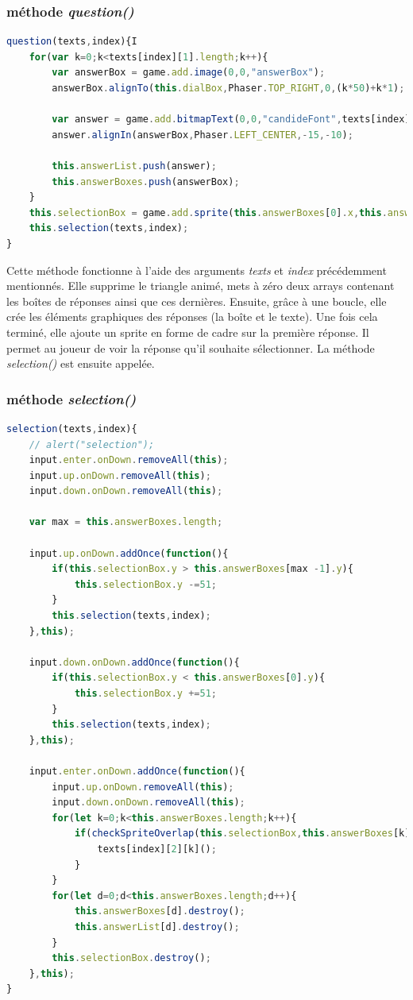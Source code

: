 \documentclass[11pt]{article}
\begin{document}
\subsubsection{méthode \textit{question()}}
\begin{lstlisting}[language=JavaScript]   
question(texts,index){I
    for(var k=0;k<texts[index][1].length;k++){
        var answerBox = game.add.image(0,0,"answerBox");
        answerBox.alignTo(this.dialBox,Phaser.TOP_RIGHT,0,(k*50)+k*1);
        
        var answer = game.add.bitmapText(0,0,"candideFont",texts[index][1][k],50);
        answer.alignIn(answerBox,Phaser.LEFT_CENTER,-15,-10);
        
        this.answerList.push(answer);
        this.answerBoxes.push(answerBox);
    }
    this.selectionBox = game.add.sprite(this.answerBoxes[0].x,this.answerBoxes[0].y,"selection");
    this.selection(texts,index);
}
\end{lstlisting} 
Cette méthode fonctionne à l'aide des arguments \textit{texts} et \textit{index} précédemment mentionnés. Elle supprime le triangle animé, mets à zéro deux arrays contenant les boîtes de réponses ainsi que ces dernières. Ensuite, grâce à une boucle, elle crée les éléments graphiques des réponses (la boîte et le texte). Une fois cela terminé, elle ajoute un sprite en forme de cadre sur la première réponse. Il permet au joueur de voir la réponse qu'il souhaite sélectionner. La méthode \textit{selection()} est ensuite appelée.

\subsubsection{méthode \textit{selection()}}
\begin{lstlisting}[language=JavaScript]
selection(texts,index){
    // alert("selection");
    input.enter.onDown.removeAll(this);
    input.up.onDown.removeAll(this);
    input.down.onDown.removeAll(this);
    
    var max = this.answerBoxes.length;
    
    input.up.onDown.addOnce(function(){
        if(this.selectionBox.y > this.answerBoxes[max -1].y){
            this.selectionBox.y -=51;
        }
        this.selection(texts,index);
    },this);
    
    input.down.onDown.addOnce(function(){
        if(this.selectionBox.y < this.answerBoxes[0].y){
            this.selectionBox.y +=51;
        }
        this.selection(texts,index);
    },this);
    
    input.enter.onDown.addOnce(function(){
        input.up.onDown.removeAll(this);
        input.down.onDown.removeAll(this);
        for(let k=0;k<this.answerBoxes.length;k++){
            if(checkSpriteOverlap(this.selectionBox,this.answerBoxes[k])){
                texts[index][2][k]();
            }
        }
        for(let d=0;d<this.answerBoxes.length;d++){
            this.answerBoxes[d].destroy();
            this.answerList[d].destroy();
        }
        this.selectionBox.destroy();
    },this);
}
\end{lstlisting} 
\end{document}
